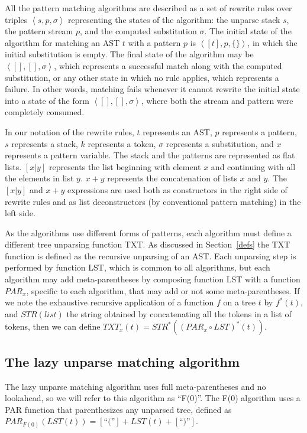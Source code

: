 \documentclass{sigplanconf}
\begin{document}
All the pattern matching algorithms are described as a set of rewrite
rules over triples $\left<s, p, \sigma\right>$ representing the states
of the algorithm: the unparse stack $s$, the pattern stream $p$, and
the computed substitution $\sigma$. The initial state of the algorithm
for matching an AST $t$ with a pattern $p$ is $\left<[t], p,
\{\}\right>$, in which the initial substitution is empty. The final
state of the algorithm may be $\left<[], [], \sigma\right>$, which
represents a successful match along with the computed substitution, or
any other state in which no rule applies, which represents a
failure. In other words, matching fails whenever it cannot rewrite the
initial state into a state of the form $\left<[], [], \sigma\right>$,
where both the stream and pattern were completely consumed.

In our notation of the rewrite rules, $t$ represents an AST, $p$
represents a pattern, $s$ represents a stack, $k$ represents a
token, $\sigma$ represents a substitution, and $x$ represents a
pattern variable. The stack and the patterns are represented as flat
lists. $[x | y]$ represents the list beginning with element $x$ and
continuing with all the elements in list $y$. $x + y$ represents the
concatenation of lists $x$ and $y$. The $[x | y]$ and $x + y$
expressions are used both as constructors in the right side of rewrite
rules and as list deconstructors (by conventional pattern matching)
in the left side.

As the algorithms use different forms of patterns, each algorithm must
define a different tree unparsing function TXT. As discussed in
Section~\ref{defs} the TXT function is defined as the recursive
unparsing of an AST. Each unparsing step is performed by function LST,
which is common to all algorithms, but each algorithm may add
meta-parentheses by composing function LST with a function $PAR_x$,
specific to each algorithm, that may add or not some
meta-parentheses. If we note the exhaustive recursive application of a
function $f$ on a tree $t$ by $f^*(t)$, and $STR(list)$ the string
obtained by concatenating all the tokens in a list of tokens, then we
can define $TXT_x(t) = STR^*((PAR_x\circ LST)^*(t))$.

\subsection{The lazy unparse matching algorithm}
\label{sec:lazy}
The lazy unparse matching algorithm uses full meta-parentheses and no
lookahead, so we will refer to this algorithm as ``F(0)''. The F(0)
algorithm uses a PAR function that parenthesizes any unparsed tree,
defined as $PAR_{F(0)}(LST(t)) = [\mbox{``(''}]+LST(t)+[\mbox{``)''}]$.
\end{document}
